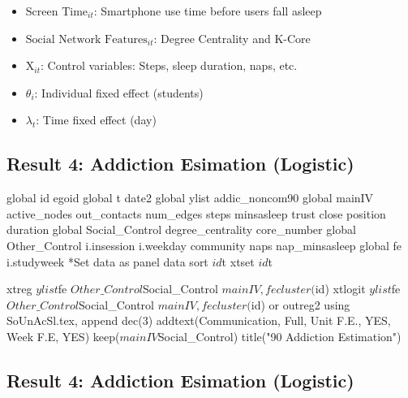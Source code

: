 \documentclass[
  letterpaper,
  DIV=11,
  numbers=noendperiod]{scrartcl}
\newenvironment{Shaded}{\begin{snugshade}}{\end{snugshade}}
\newcommand{\BuiltInTok}[1]{\textcolor[rgb]{0.00,0.23,0.31}{#1}}
\newcommand{\DecValTok}[1]{\textcolor[rgb]{0.68,0.00,0.00}{#1}}
\newcommand{\ImportTok}[1]{\textcolor[rgb]{0.00,0.46,0.62}{#1}}
\newcommand{\KeywordTok}[1]{\textcolor[rgb]{0.00,0.23,0.31}{#1}}
\newcommand{\NormalTok}[1]{\textcolor[rgb]{0.00,0.23,0.31}{#1}}
\newcommand{\OperatorTok}[1]{\textcolor[rgb]{0.37,0.37,0.37}{#1}}
\newcommand{\StringTok}[1]{\textcolor[rgb]{0.13,0.47,0.30}{#1}}
\providecommand{\tightlist}{%
  \setlength{\itemsep}{0pt}\setlength{\parskip}{0pt}}\usepackage{longtable,booktabs,array}
\begin{document}
\begin{itemize}
\tightlist
\item
  \(\text{Screen Time}_{it}\): Smartphone use time before users fall
  asleep
\item
  \(\text{Social Network Features}_{it}\): Degree Centrality and K-Core
\item
  \(\text{X}_{it}\): Control variables: Steps, sleep duration, naps,
  etc.
\item
  \(\theta_i\): Individual fixed effect (students)
\item
  \(\lambda_t\): Time fixed effect (day)
\end{itemize}

\hypertarget{result-4-addiction-esimation-logistic-1}{%
\subsection{Result 4: Addiction Esimation
(Logistic)}\label{result-4-addiction-esimation-logistic-1}}

\begin{Shaded}
\begin{Highlighting}[numbers=left,,]
\KeywordTok{global} \BuiltInTok{id}\NormalTok{ egoid}
\KeywordTok{global}\NormalTok{ t date2}
\KeywordTok{global}\NormalTok{ ylist addic\_noncom90}
\KeywordTok{global}\NormalTok{ mainIV  active\_nodes out\_contacts  num\_edges  steps minsasleep trust close position duration}
\KeywordTok{global}\NormalTok{ Social\_Control degree\_centrality core\_number}
\KeywordTok{global}\NormalTok{ Other\_Control i.insession i.weekday community naps nap\_minsasleep}
\KeywordTok{global}\NormalTok{ fe i.studyweek}
\OperatorTok{*}\NormalTok{Set data }\ImportTok{as}\NormalTok{ panel data}
\NormalTok{sort $id $t}
\NormalTok{xtset $id $t}

\NormalTok{xtreg $ylist $fe  $Other\_Control $Social\_Control  $mainIV , fe cluster($id) }
\NormalTok{xtlogit $ylist $fe  $Other\_Control $Social\_Control  $mainIV , fe cluster($id) }\KeywordTok{or}
\NormalTok{outreg2 using SoUnAcSl.tex, append dec(}\DecValTok{3}\NormalTok{) addtext(Communication, Full, Unit F.E., YES, Week F.E, YES) keep($mainIV $Social\_Control)  title(}\StringTok{"90 Addiction Estimation"}\NormalTok{)}
\end{Highlighting}
\end{Shaded}

\hypertarget{result-4-addiction-esimation-logistic-2}{%
\subsection{Result 4: Addiction Esimation
(Logistic)}\label{result-4-addiction-esimation-logistic-2}}
\end{document}
